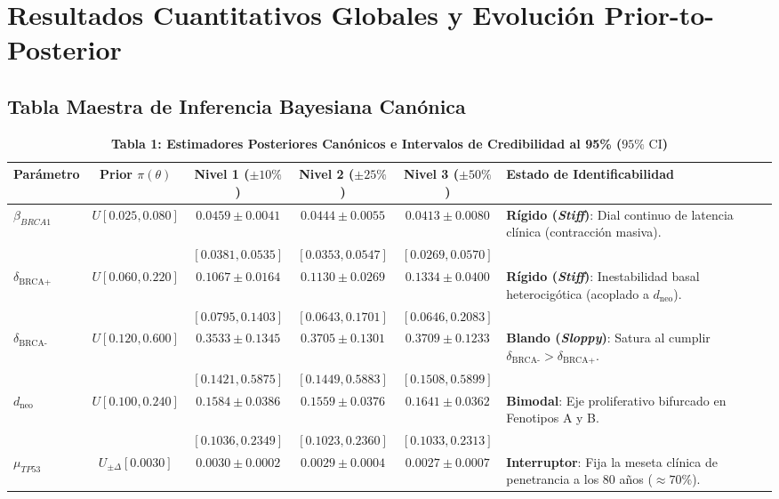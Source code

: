 \documentclass[10pt,a4paper]{article}
\begin{document}
\section{Resultados Cuantitativos Globales y Evolución Prior-to-Posterior}

\subsection{Tabla Maestra de Inferencia Bayesiana Canónica}

\begin{table}[h!]
\centering
\scriptsize
\caption{\textbf{Tabla 1: Estimadores Posteriores Canónicos e Intervalos de Credibilidad al 95\% ($95\%\text{ CI}$)}}
\begin{tabularx}{\textwidth}{lccccX}
\toprule
\textbf{Parámetro} & \textbf{Prior $\pi(\theta)$} & \textbf{Nivel 1 ($\pm10\%$)} & \textbf{Nivel 2 ($\pm25\%$)} & \textbf{Nivel 3 ($\pm50\%$)} & \textbf{Estado de Identificabilidad} \\
\midrule
$\beta_{BRCA1}$ & $U[0.025, 0.080]$ & \textbf{$0.0459 \pm 0.0041$} & \textbf{$0.0444 \pm 0.0055$} & \textbf{$0.0413 \pm 0.0080$} & \textbf{Rígido (\textit{Stiff})}: Dial continuo de latencia clínica (contracción masiva). \\
& & $[0.0381, 0.0535]$ & $[0.0353, 0.0547]$ & $[0.0269, 0.0570]$ & \\
$\delta_{\text{BRCA+}}$ & $U[0.060, 0.220]$ & \textbf{$0.1067 \pm 0.0164$} & \textbf{$0.1130 \pm 0.0269$} & $0.1334 \pm 0.0400$ & \textbf{Rígido (\textit{Stiff})}: Inestabilidad basal heterocigótica (acoplado a $d_{\text{neo}}$). \\
& & $[0.0795, 0.1403]$ & $[0.0643, 0.1701]$ & $[0.0646, 0.2083]$ & \\
$\delta_{\text{BRCA-}}$ & $U[0.120, 0.600]$ & $0.3533 \pm 0.1345$ & $0.3705 \pm 0.1301$ & $0.3709 \pm 0.1233$ & \textbf{Blando (\textit{Sloppy})}: Satura al cumplir $\delta_{\text{BRCA-}} > \delta_{\text{BRCA+}}$. \\
& & $[0.1421, 0.5875]$ & $[0.1449, 0.5883]$ & $[0.1508, 0.5899]$ & \\
$d_{\text{neo}}$ & $U[0.100, 0.240]$ & $0.1584 \pm 0.0386$ & $0.1559 \pm 0.0376$ & $0.1641 \pm 0.0362$ & \textbf{Bimodal}: Eje proliferativo bifurcado en Fenotipos A y B. \\
& & $[0.1036, 0.2349]$ & $[0.1023, 0.2360]$ & $[0.1033, 0.2313]$ & \\
$\mu_{TP53}$ & $U_{\pm \Delta}[0.0030]$ & $0.0030 \pm 0.0002$ & $0.0029 \pm 0.0004$ & $0.0027 \pm 0.0007$ & \textbf{Interruptor}: Fija la meseta clínica de penetrancia a los 80 años ($\approx 70\%$). \\

\end{tabularx}
\end{table}
\end{document}
